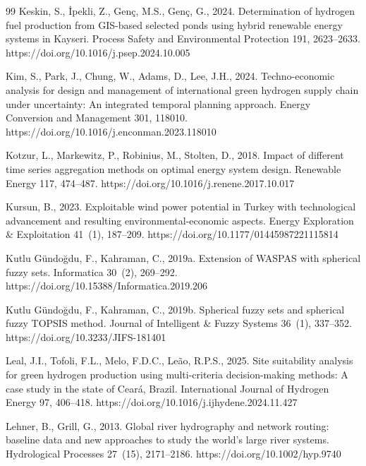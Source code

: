 \documentclass[preprint,12pt,authoryear]{elsarticle}
\begin{document}
\begin{thebibliography}{99}
Keskin, S., {\.I}pekli, Z., Gen{\c{c}}, M.S., Gen{\c{c}}, G., 2024. Determination of hydrogen fuel production from GIS-based selected ponds using hybrid renewable energy systems in Kayseri. Process Safety and Environmental Protection 191, 2623--2633. https://doi.org/10.1016/j.psep.2024.10.005

Kim, S., Park, J., Chung, W., Adams, D., Lee, J.H., 2024. Techno-economic analysis for design and management of international green hydrogen supply chain under uncertainty: An integrated temporal planning approach. Energy Conversion and Management 301, 118010. https://doi.org/10.1016/j.enconman.2023.118010

Kotzur, L., Markewitz, P., Robinius, M., Stolten, D., 2018. Impact of different time series aggregation methods on optimal energy system design. Renewable Energy 117, 474--487. https://doi.org/10.1016/j.renene.2017.10.017

Kursun, B., 2023. Exploitable wind power potential in Turkey with technological advancement and resulting environmental-economic aspects. Energy Exploration \& Exploitation 41~(1), 187--209. https://doi.org/10.1177/01445987221115814

Kutlu G{\"u}ndo{\u{g}}du, F., Kahraman, C., 2019a. Extension of WASPAS with spherical fuzzy sets. Informatica 30~(2), 269--292. https://doi.org/10.15388/Informatica.2019.206

Kutlu G{\"u}ndo{\u{g}}du, F., Kahraman, C., 2019b. Spherical fuzzy sets and spherical fuzzy TOPSIS method. Journal of Intelligent \& Fuzzy Systems 36~(1), 337--352. https://doi.org/10.3233/JIFS-181401

Leal, J.I., Tofoli, F.L., Melo, F.D.C., Le{\~a}o, R.P.S., 2025. Site suitability analysis for green hydrogen production using multi-criteria decision-making methods: A case study in the state of Cear{\'a}, Brazil. International Journal of Hydrogen Energy 97, 406--418. https://doi.org/10.1016/j.ijhydene.2024.11.427

Lehner, B., Grill, G., 2013. Global river hydrography and network routing: baseline data and new approaches to study the world's large river systems. Hydrological Processes 27~(15), 2171--2186. https://doi.org/10.1002/hyp.9740


\end{thebibliography}
\end{document}

